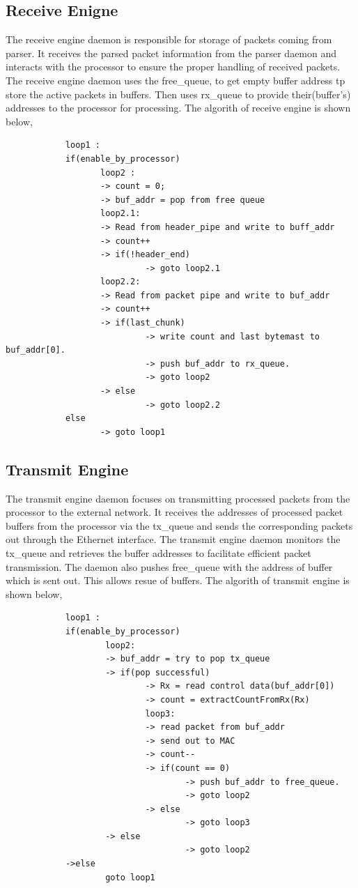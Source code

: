 \documentclass[12pt]{report}
\begin{document}
		\subsection{Receive Enigne}
				The receive engine daemon is responsible for storage of packets coming from parser. It receives the parsed packet information from the parser daemon and interacts with the processor to ensure the proper handling of received packets. The receive engine daemon uses the free\_queue, to get empty buffer address tp store the active packets in buffers.
			Then uses rx\_queue to provide their(buffer's) addresses to the processor for processing. The algorith of receive engine is shown below,
		\begin{verbatim}
			loop1 :
			if(enable_by_processor)
			       loop2 :
			       -> count = 0;
			       -> buf_addr = pop from free queue
			       loop2.1:
			       -> Read from header_pipe and write to buff_addr
			       -> count++
			       -> if(!header_end)
			       	        -> goto loop2.1
			       loop2.2:
			       -> Read from packet pipe and write to buf_addr 
			       -> count++
			       -> if(last_chunk)
			       	        -> write count and last bytemast to buf_addr[0].
			       	        -> push buf_addr to rx_queue.
			                -> goto loop2
			       -> else
			       	        -> goto loop2.2
			else
			       -> goto loop1
		\end{verbatim}

		\subsection{Transmit Engine}
				The transmit engine daemon focuses on transmitting processed packets from the processor to the external network. It receives the addresses of processed packet buffers from the processor via the tx\_queue and sends the corresponding packets out through the Ethernet interface. The transmit engine daemon monitors the tx\_queue and retrieves the buffer addresses to facilitate efficient packet transmission. The daemon also pushes free\_queue with the address of buffer which is sent out. This allows resue of buffers. The algorith of transmit engine is shown below,
		\begin{verbatim}
			loop1 : 
			if(enable_by_processor)
			        loop2:
			        -> buf_addr = try to pop tx_queue
			        -> if(pop successful)
			                -> Rx = read control data(buf_addr[0]) 
			                -> count = extractCountFromRx(Rx)
			                loop3:
			                -> read packet from buf_addr
			                -> send out to MAC
			                -> count--
			                -> if(count == 0)
			                        -> push buf_addr to free_queue.
			                        -> goto loop2 
			                -> else
			                        -> goto loop3
			        -> else
			                        -> goto loop2
			->else
			        goto loop1
		\end{verbatim}
\end{document}

